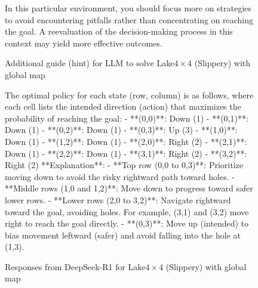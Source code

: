 \documentclass{article}
\begin{document}
\begin{figure}
\begin{mdframed}[roundcorner=10pt]
In this particular environment, you should focus more on strategies to avoid encountering pitfalls rather than concentrating on reaching the goal. A reevaluation of the decision-making process in this context may yield more effective outcomes.
\end{mdframed}
\caption{Additional guide (hint) for LLM to solve Lake$4\times4$ (Slippery) with global map}
\label{page:prompts_hint}
\end{figure}
\begin{figure}
\begin{mdframed}[roundcorner=10pt]
The optimal policy for each state (row, column) is as follows, where each cell lists the intended direction (action) that maximizes the probability of reaching the goal:
- **(0,0)**: Down (1)
- **(0,1)**: Down (1)
- **(0,2)**: Down (1)
- **(0,3)**: Up (3)
- **(1,0)**: Down (1)
- **(1,2)**: Down (1)
- **(2,0)**: Right (2)
- **(2,1)**: Down (1)
- **(2,2)**: Down (1)
- **(3,1)**: Right (2)
- **(3,2)**: Right (2)
**Explanation**:
- **Top row (0,0 to 0,3)**: Prioritize moving down to avoid the risky rightward path toward holes.
- **Middle rows (1,0 and 1,2)**: Move down to progress toward safer lower rows.
- **Lower rows (2,0 to 3,2)**: Navigate rightward toward the goal, avoiding holes. For example, (3,1) and (3,2) move right to reach the goal directly.
- **(0,3)**: Move up (intended) to bias movement leftward (safer) and avoid falling into the hole at (1,3).
\end{mdframed}
\caption{Responses from DeepSeek-R1 for Lake$4\times4$ (Slippery) with global map}
\label{page:results_ds_w_hint}
\end{figure}
\end{document}
